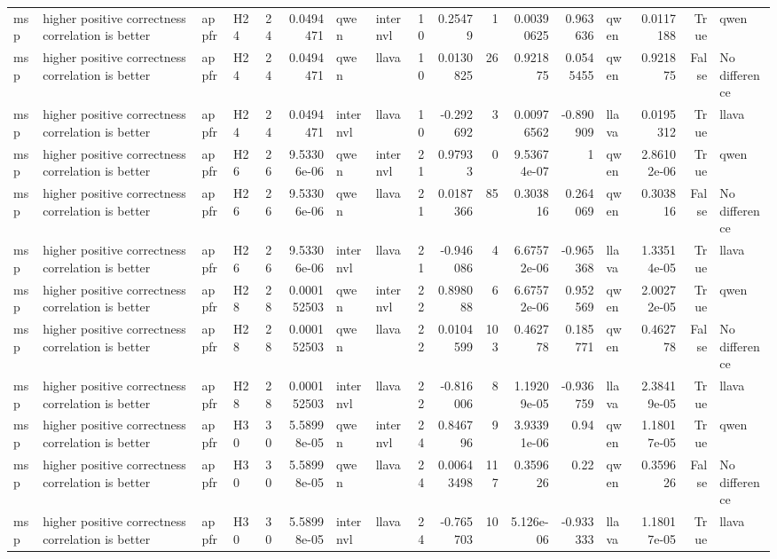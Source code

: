 \begin{longtable}{llllrrllrrrrrlrrl}
msp & higher positive correctness correlation is better & appfr & H24 & 24 & 0.0494471 & qwen & internvl & 10 & 0.25479 & 1 & 0.00390625 & 0.963636 & qwen & 0.0117188 & True & qwen \\
msp & higher positive correctness correlation is better & appfr & H24 & 24 & 0.0494471 & qwen & llava & 10 & 0.0130825 & 26 & 0.921875 & 0.0545455 & qwen & 0.921875 & False & No difference \\
msp & higher positive correctness correlation is better & appfr & H24 & 24 & 0.0494471 & internvl & llava & 10 & -0.292692 & 3 & 0.00976562 & -0.890909 & llava & 0.0195312 & True & llava \\
msp & higher positive correctness correlation is better & appfr & H26 & 26 & 9.53306e-06 & qwen & internvl & 21 & 0.97933 & 0 & 9.53674e-07 & 1 & qwen & 2.86102e-06 & True & qwen \\
msp & higher positive correctness correlation is better & appfr & H26 & 26 & 9.53306e-06 & qwen & llava & 21 & 0.0187366 & 85 & 0.303816 & 0.264069 & qwen & 0.303816 & False & No difference \\
msp & higher positive correctness correlation is better & appfr & H26 & 26 & 9.53306e-06 & internvl & llava & 21 & -0.946086 & 4 & 6.67572e-06 & -0.965368 & llava & 1.33514e-05 & True & llava \\
msp & higher positive correctness correlation is better & appfr & H28 & 28 & 0.000152503 & qwen & internvl & 22 & 0.898088 & 6 & 6.67572e-06 & 0.952569 & qwen & 2.00272e-05 & True & qwen \\
msp & higher positive correctness correlation is better & appfr & H28 & 28 & 0.000152503 & qwen & llava & 22 & 0.0104599 & 103 & 0.462778 & 0.185771 & qwen & 0.462778 & False & No difference \\
msp & higher positive correctness correlation is better & appfr & H28 & 28 & 0.000152503 & internvl & llava & 22 & -0.816006 & 8 & 1.19209e-05 & -0.936759 & llava & 2.38419e-05 & True & llava \\
msp & higher positive correctness correlation is better & appfr & H30 & 30 & 5.58998e-05 & qwen & internvl & 24 & 0.846796 & 9 & 3.93391e-06 & 0.94 & qwen & 1.18017e-05 & True & qwen \\
msp & higher positive correctness correlation is better & appfr & H30 & 30 & 5.58998e-05 & qwen & llava & 24 & 0.00643498 & 117 & 0.359626 & 0.22 & qwen & 0.359626 & False & No difference \\
msp & higher positive correctness correlation is better & appfr & H30 & 30 & 5.58998e-05 & internvl & llava & 24 & -0.765703 & 10 & 5.126e-06 & -0.933333 & llava & 1.18017e-05 & True & llava \\

\end{longtable}
